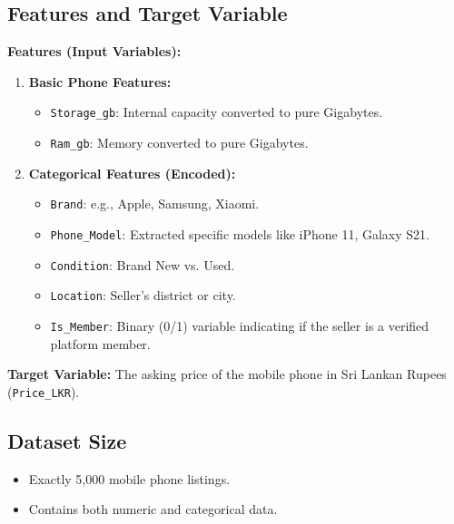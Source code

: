 \documentclass[12pt,a4paper]{article}
\begin{document}
\subsection{Features and Target Variable}
\textbf{Features (Input Variables):}
\begin{enumerate}
    \item \textbf{Basic Phone Features:}
    \begin{itemize}
        \item \texttt{Storage\_gb}: Internal capacity converted to pure Gigabytes.
        \item \texttt{Ram\_gb}: Memory converted to pure Gigabytes.
    \end{itemize}
    \item \textbf{Categorical Features (Encoded):}
    \begin{itemize}
        \item \texttt{Brand}: e.g., Apple, Samsung, Xiaomi.
        \item \texttt{Phone\_Model}: Extracted specific models like iPhone 11, Galaxy S21.
        \item \texttt{Condition}: Brand New vs. Used.
        \item \texttt{Location}: Seller's district or city.
        \item \texttt{Is\_Member}: Binary (0/1) variable indicating if the seller is a verified platform member.
    \end{itemize}
\end{enumerate}

\textbf{Target Variable:} The asking price of the mobile phone in Sri Lankan Rupees (\texttt{Price\_LKR}). 

\subsection{Dataset Size}
\begin{itemize}
    \item Exactly 5,000 mobile phone listings.
    \item Contains both numeric and categorical data.
\end{itemize}
\end{document}
